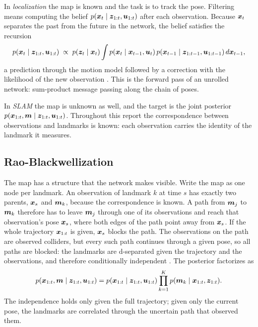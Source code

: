 In \emph{localization} the map is known and the task is to track the pose. Filtering means computing the belief
$p(\bm{x}_t \mid \bm{z}_{1:t}, \bm{u}_{1:t})$ after each observation. Because $\bm{x}_t$ separates the past from the future in the
network, the belief satisfies the recursion
\begin{equation}
  p(\bm{x}_t \mid \bm{z}_{1:t}, \bm{u}_{1:t}) \;\propto\; p(\bm{z}_t \mid \bm{x}_t)
  \int p(\bm{x}_t \mid \bm{x}_{t-1}, \bm{u}_t)\, p(\bm{x}_{t-1} \mid \bm{z}_{1:t-1}, \bm{u}_{1:t-1})\, d\bm{x}_{t-1},
  \label{eq:bayes-filter}
\end{equation}
a prediction through the motion model followed by a correction with the likelihood of the new observation
\cite{thrun2005probabilistic}. This is the forward pass of an unrolled network: sum-product message passing along
the chain of poses.

In \emph{SLAM} the map is unknown as well, and the target is the joint posterior $p(\bm{x}_{1:t}, \bm{m} \mid \bm{z}_{1:t},
\bm{u}_{1:t})$. Throughout this report the correspondence between observations and landmarks is known: each
observation carries the identity of the landmark it measures.

\subsection{Rao-Blackwellization}

The map has a structure that the network makes visible. Write the map as one node per landmark. An observation of
landmark $k$ at time $s$ has exactly two parents, $\bm{x}_s$ and $\bm{m}_k$, because the correspondence is known. A path from
$\bm{m}_j$ to $\bm{m}_k$ therefore has to leave $\bm{m}_j$ through one of its observations and reach that observation's pose
$\bm{x}_s$, where both edges of the path point away from $\bm{x}_s$. If the whole trajectory $\bm{x}_{1:t}$ is given, $\bm{x}_s$
blocks the path. The observations on the path are observed colliders, but every such path continues through a given
pose, so all paths are blocked: the landmarks are d-separated given the trajectory and the observations, and
therefore conditionally independent \cite{koller2009probabilistic}. The posterior factorizes as
\begin{equation}
  p(\bm{x}_{1:t}, \bm{m} \mid \bm{z}_{1:t}, \bm{u}_{1:t}) = p(\bm{x}_{1:t} \mid \bm{z}_{1:t}, \bm{u}_{1:t})
  \prod_{k=1}^{K} p(\bm{m}_k \mid \bm{x}_{1:t}, \bm{z}_{1:t}).
  \label{eq:rao-blackwell}
\end{equation}
The independence holds only given the full trajectory; given only the current pose, the landmarks are correlated
through the uncertain path that observed them.

